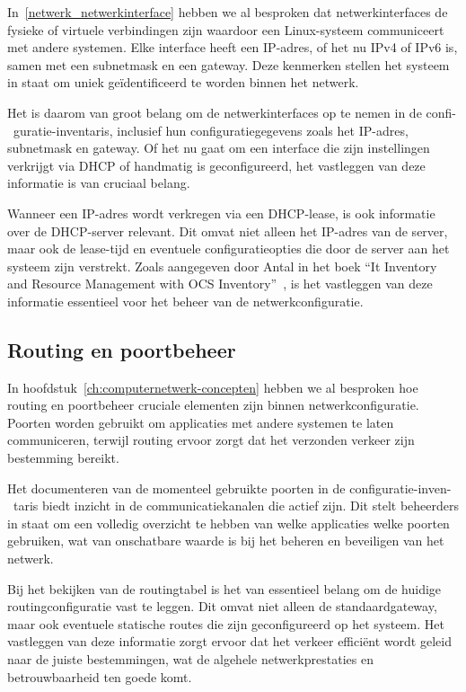 In~\ref{netwerk_netwerkinterface} hebben we al besproken dat netwerkinterfaces de fysieke of virtuele verbindingen zijn waardoor een Linux-systeem communiceert met andere systemen.
Elke interface heeft een IP-adres, of het nu IPv4 of IPv6 is, samen met een subnetmask en een gateway.
Deze kenmerken stellen het systeem in staat om uniek ge\"identificeerd te worden binnen het netwerk.

Het is daarom van groot belang om de netwerkinterfaces op te nemen in de confi-\ guratie-inventaris, inclusief hun configuratiegegevens zoals het IP-adres, subnetmask en gateway.
Of het nu gaat om een interface die zijn instellingen verkrijgt via DHCP of handmatig is geconfigureerd, het vastleggen van deze informatie is van cruciaal belang.

Wanneer een IP-adres wordt verkregen via een DHCP-lease, is ook informatie over de DHCP-server relevant.
Dit omvat niet alleen het IP-adres van de server, maar ook de lease-tijd en eventuele configuratieopties die door de server aan het systeem zijn verstrekt.
Zoals aangegeven door Antal in het boek ``It Inventory and Resource Management with OCS Inventory''~\autocite{Antal2010}, is het vastleggen van deze informatie essentieel voor het beheer van de netwerkconfiguratie.

\subsection{Routing en poortbeheer}
\label{risico_routing_poorten}

In hoofdstuk~\ref{ch:computernetwerk-concepten} hebben we al besproken hoe routing en poortbeheer cruciale elementen zijn binnen netwerkconfiguratie.
Poorten worden gebruikt om applicaties met andere systemen te laten communiceren, terwijl routing ervoor zorgt dat het verzonden verkeer zijn bestemming bereikt.

Het documenteren van de momenteel gebruikte poorten in de configuratie-inven-\ taris biedt inzicht in de communicatiekanalen die actief zijn.
Dit stelt beheerders in staat om een volledig overzicht te hebben van welke applicaties welke poorten gebruiken, wat van onschatbare waarde is bij het beheren en beveiligen van het netwerk.

Bij het bekijken van de routingtabel is het van essentieel belang om de huidige routingconfiguratie vast te leggen.
Dit omvat niet alleen de standaardgateway, maar ook eventuele statische routes die zijn geconfigureerd op het systeem.
Het vastleggen van deze informatie zorgt ervoor dat het verkeer effici\"ent wordt geleid naar de juiste bestemmingen, wat de algehele netwerkprestaties en betrouwbaarheid ten goede komt.

